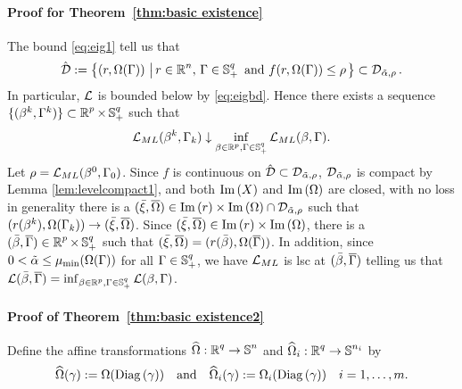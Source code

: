 \paragraph{\bf Proof for Theorem~\ref{thm:basic existence}}

The bound \eqref{eq:eig1}  
tell us that 
\[
\hat\DD:=\lset{(r,\Omega(\Gam))}{r\in\R^n,\, \Gam\in\bS_{+}^{q}
\ \text{and}\ f(r,\Omega(\Gam))\le\rho}
\subset\DD_{\talf,\rho}.
\]
In particular, 
$\LL$ is bounded below by \eqref{eq:eigbd}.
Hence there exists a sequence 
$\{(\beta^k,\Gam^k)\}\subset\R^p\times\bS_{+}^{q}$
such that 
\[
\LL_{ML}(\beta^k,\Gam_k)\downarrow
\inf_{\beta\in\R^p,\Gam\in\bS_{+}^{q}}\LL_{ML}(\beta,\Gam).
\]
Let $\rho=\LL_{ML}(\beta^0,\Gam_0)$.
Since $f$ is continuous on $\hat\DD\subset\DD_{\talf,\rho}$, 
$\DD_{\talf,\rho}$ is compact by Lemma \ref{lem:levelcompact1},
and both $\im{X}$ and $\im{\Omega}$ are closed,
%
%
with no loss in generality there is a
$(\bxi,\overline\Omega)\in\im{r}\times\im{\Omega}
\cap \DD_{\talf,\rho}$ 
such that
$(r(\beta^k),\Omega(\Gam_k))\rightarrow(\bxi,\overline\Omega)$. 
Since $(\bxi,\overline\Omega)\in \im{r}\times\im{\Omega}$,
there is a $(\bbeta,\overline\Gam)\in\R^p\times\bS^q_+$ such that
$(\bxi,\overline\Omega)=(r(\bbeta),\Omega(\overline\Gam))$.
In addition, since
$0<\talf\le \mu_\mmin(\Omega(\Gam))$ for all
$\Gam\in\bS_{+}^{q}$, we have $\LL_{ML}$ is lsc at $(\bbeta,\overline\Gam)$ 
telling us that $\LL(\bbeta,\overline\Gam)
=\inf_{\beta\in\R^p,\Gam\in\bS_{+}^{q}}\LL(\beta,\Gam)$.


\paragraph{\bf Proof of Theorem~\ref{thm:basic existence2}}

Define the affine transformations
$\map{\hOmega}{\R^q}{\bS^n}$ and $\map{\hOmega_i}{\R^q}{\bS^{n_i}}$ by
\begin{equation}
\hOmega(\gam):=\Omega(\Diag{\gam})\ \ \text{ and }\ \ 
\hOmega_i(\gam):=\Omega_i(\Diag{\gam})\quad i=1,\dots,m.
\end{equation}




